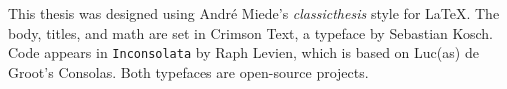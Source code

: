 This thesis was designed using Andr\'e Miede's
\textit{classicthesis} style for \LaTeX.
The body, titles, and math are set in Crimson Text, a typeface by Sebastian Kosch.
Code appears in \texttt{Inconsolata} by Raph Levien, which is based on Luc(as)
de Groot's Consolas.
Both typefaces are open-source projects.
